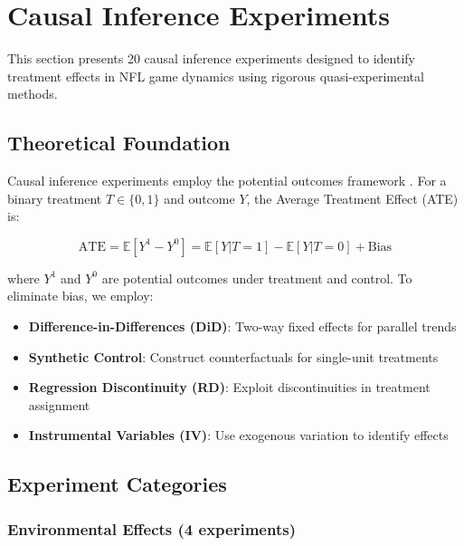 \section{Causal Inference Experiments}
\label{sec:causal_experiments}

This section presents 20 causal inference experiments designed to identify treatment effects in NFL game dynamics using rigorous quasi-experimental methods.

\subsection{Theoretical Foundation}

Causal inference experiments employ the potential outcomes framework \citep{rubin1974estimating}. For a binary treatment $T \in \{0,1\}$ and outcome $Y$, the Average Treatment Effect (ATE) is:

\begin{equation}
\text{ATE} = \mathbb{E}[Y^1 - Y^0] = \mathbb{E}[Y|T=1] - \mathbb{E}[Y|T=0] + \text{Bias}
\end{equation}

where $Y^1$ and $Y^0$ are potential outcomes under treatment and control. To eliminate bias, we employ:

\begin{itemize}
    \item \textbf{Difference-in-Differences (DiD)}: Two-way fixed effects for parallel trends
    \item \textbf{Synthetic Control}: Construct counterfactuals for single-unit treatments
    \item \textbf{Regression Discontinuity (RD)}: Exploit discontinuities in treatment assignment
    \item \textbf{Instrumental Variables (IV)}: Use exogenous variation to identify effects
\end{itemize}

\subsection{Experiment Categories}

\subsubsection{Environmental Effects (4 experiments)}

